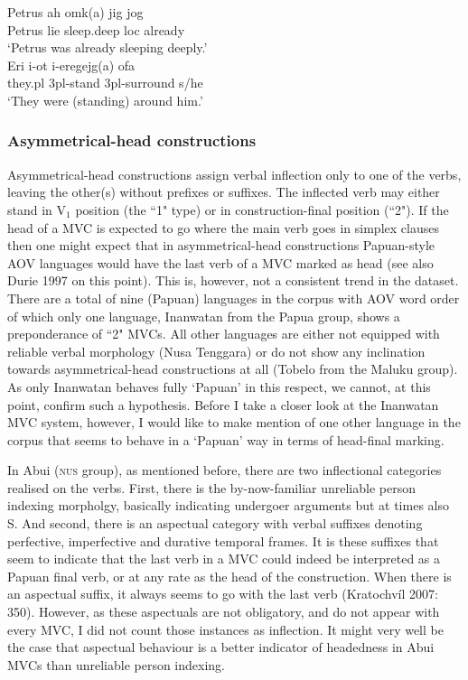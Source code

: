 \ea \label{}
\gll Petrus ah omk(a) jig jog \\
Petrus lie sleep.deep \acs{loc} already \\
\glft `Petrus was already sleeping deeply.’ \\ 
\z
\xe
\ea \label{}
\gll Eri i-ot i-eregejg(a) ofa \\
they.\acs{pl} 3\acs{pl}-stand 3\acs{pl}-surround s/he \\
\glft `They were (standing) around him.’ \\ 
\z
\xe

\subsubsection{Asymmetrical-head constructions} \label{sec:asymmetrical}

Asymmetrical-head constructions assign verbal inflection only to one of the verbs, leaving the other(s) without prefixes or suffixes. The inflected verb may either stand in V$_1$ position (the ``1" type) or in construction-final position (``2"). If the head of a MVC is expected to go where the main verb goes in simplex clauses then one might expect that in asymmetrical-head constructions Papuan-style AOV languages would have the last verb of a MVC marked as head (see also Durie 1997 on this point). This is, however, not a consistent trend in the dataset. There are a total of nine (Papuan) languages in the corpus with AOV word order of which only one language, Inanwatan from the Papua group, shows a preponderance of ``2" MVCs. All other languages are either not equipped with reliable verbal morphology (Nusa Tenggara) or do not show any inclination towards asymmetrical-head constructions at all (Tobelo from the Maluku group). As only Inanwatan behaves fully `Papuan' in this respect, we cannot, at this point, confirm such a hypothesis. Before I take a closer look at the Inanwatan MVC system, however, I would like to make mention of one other language in the corpus that seems to behave in a `Papuan' way in terms of head-final marking.

In Abui (\textsc{nus} group), as mentioned before, there are two inflectional categories realised on the verbs. First, there is the by-now-familiar unreliable person indexing morpholgy, basically indicating undergoer arguments but at times also S. And second, there is an aspectual category with verbal suffixes denoting perfective, imperfective and durative temporal frames. It is these suffixes that seem to indicate that the last verb in a MVC could indeed be interpreted as a Papuan final verb, or at any rate as the head of the construction. When there is an aspectual suffix, it always seems to go with the last verb (Kratochvíl 2007: 350). However, as these aspectuals are not obligatory, and do not appear with every MVC, I did not count those instances as inflection. It might very well be the case that aspectual behaviour is a better indicator of headedness in Abui MVCs than unreliable person indexing.  


